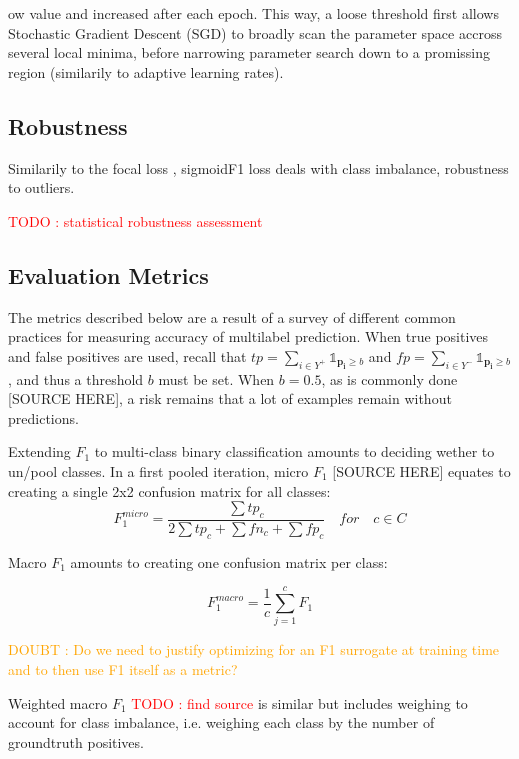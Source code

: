 \documentclass[sigconf,natbib,screen=true,review=true,anonymous]{acmart}
\newcommand\todo[1]{\textcolor{red}{TODO : #1}}
\newcommand\doubt[1]{\textcolor{orange}{DOUBT : #1}}
\begin{document}
ow value and increased after each epoch. This way, a loose threshold first allows Stochastic Gradient Descent (SGD) to broadly scan the parameter space accross several local minima, before narrowing parameter search down to a promissing region (similarily to adaptive learning rates).



\subsection{Robustness}
\label{sec:org259a021}


Similarily to the focal loss \cite{focalLoss}, sigmoidF1 loss deals with class imbalance, robustness to outliers.

\todo{statistical robustness assessment}



\subsection{Evaluation Metrics}
\label{sec:orgfc4c2e0}

The metrics described below are a result of a survey of different common practices for measuring accuracy of multilabel prediction. When true positives and false positives are used, recall that \(t p=\sum_{i \in Y^{+}} \mathds{1}_{\mathbf{p_i} \geq b}\) and \(f p=\sum_{i \in Y^{-}} \mathds{1}_{\mathbf{p_i} \geq b}\), and thus a threshold \(b\) must be set. When \(b = 0.5\), as is commonly done [SOURCE HERE], a risk remains that a lot of examples remain without predictions.

Extending \(F_1\) to multi-class binary classification amounts to deciding wether to un/pool classes.
In a first pooled iteration, micro \(F_1\) [SOURCE HERE] equates to creating a single 2x2 confusion matrix for all classes:
$$F_1^{micro} = \frac{\sum tp_c}{2 \sum tp_c + \sum fn_c + \sum fp_c} \quad for \quad c \in C$$

Macro \(F_1\) \cite{threshForF1} amounts to creating one confusion matrix per class:

$$F_1^{macro} = \frac{1}{c} \sum_{j=1}^c F_1$$

\doubt{Do we need to justify optimizing for an F1 surrogate at training time and to then use F1 itself as a metric?}

Weighted macro \(F_1\) \todo{find source} is similar but includes weighing to account for class imbalance, i.e. weighing each class by the number of groundtruth positives.
\end{document}
